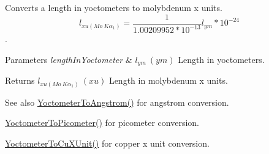 Converts a length in yoctometers to molybdenum x units. \[ l_{xu(Mo\ K\alpha_1)}=\frac{1}{1.00209952*10^{-13}} l_{ym} * 10^{-24}\]. 


\begin{DoxyParams}{Parameters}
{\em length\+In\+Yoctometer} & $ l_{ym}\ (ym)$ Length in yoctometers. \\
\hline
\end{DoxyParams}
\begin{DoxyReturn}{Returns}
$ l_{xu(Mo\ K\alpha_1)}\ (xu)$ Length in molybdenum x units. 
\end{DoxyReturn}
\begin{DoxySeeAlso}{See also}
\mbox{\hyperlink{group___e_g_x_math-_conversions-_length_conversions-_yoctometer-_non-_s_i_ga1189896c419175e90e23cea9d8f6b52a}{Yoctometer\+To\+Angstrom()}} for angstrom conversion. 

\mbox{\hyperlink{group___e_g_x_math-_conversions-_length_conversions-_yoctometer-_s_i_gab621b78b78d6776131912bd6038901b9}{Yoctometer\+To\+Picometer()}} for picometer conversion. 

\mbox{\hyperlink{group___e_g_x_math-_conversions-_length_conversions-_yoctometer-_non-_s_i_ga0266faf325ea86fef13391fb6e792ff8}{Yoctometer\+To\+Cu\+X\+Unit()}} for copper x unit conversion. 
\end{DoxySeeAlso}
